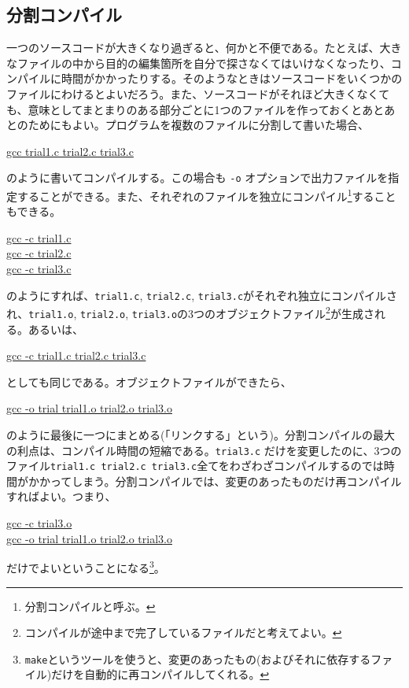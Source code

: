 \subsection {分割コンパイル}

一つのソースコードが大きくなり過ぎると、何かと不便である。たとえば、大きなファイルの中から目的の編集箇所を自分で探さなくてはいけなくなったり、コンパイルに時間がかかったりする。そのようなときはソースコードをいくつかのファイルにわけるとよいだろう。また、ソースコードがそれほど大きくなくても、意味としてまとまりのある部分ごとに1つのファイルを作っておくとあとあとのためにもよい。プログラムを複数のファイルに分割して書いた場合、
\begin{commandline2}
\prompt \underline{gcc trial1.c trial2.c trial3.c}
\end{commandline2} \noindent
のように書いてコンパイルする。この場合も {\tt -o} オプションで出力ファイルを指定することができる。また、それぞれのファイルを独立にコンパイル\footnote{分割コンパイルと呼ぶ。}することもできる。
\begin{commandline2}
\prompt \underline{gcc -c trial1.c} \\
\prompt \underline{gcc -c trial2.c} \\
\prompt \underline{gcc -c trial3.c}
\end{commandline2} \noindent
のようにすれば、{\tt trial1.c}, {\tt trial2.c}, {\tt trial3.c}がそれぞれ独立にコンパイルされ、{\tt trial1.o}, {\tt trial2.o}, {\tt trial3.o}の3つのオブジェクトファイル\footnote{コンパイルが途中まで完了しているファイルだと考えてよい。}が生成される。あるいは、
\begin{commandline2}
\prompt \underline{gcc -c trial1.c trial2.c trial3.c}
\end{commandline2} \noindent
としても同じである。オブジェクトファイルができたら、
\begin{commandline2}
\prompt \underline{gcc -o trial trial1.o trial2.o trial3.o}
\end{commandline2} \noindent
のように最後に一つにまとめる(「リンクする」という)。分割コンパイルの最大の利点は、コンパイル時間の短縮である。{\tt trial3.c} だけを変更したのに、3つのファイル{\tt trial1.c trial2.c trial3.c}全てをわざわざコンパイルするのでは時間がかかってしまう。分割コンパイルでは、変更のあったものだけ再コンパイルすればよい。つまり、
\begin{commandline2}
\prompt \underline{gcc -c trial3.o} \\
\prompt \underline{gcc -o trial trial1.o trial2.o trial3.o}
\end{commandline2} \noindent
だけでよいということになる\footnote{{\tt make}というツールを使うと、変更のあったもの(およびそれに依存するファイル)だけを自動的に再コンパイルしてくれる。}。

